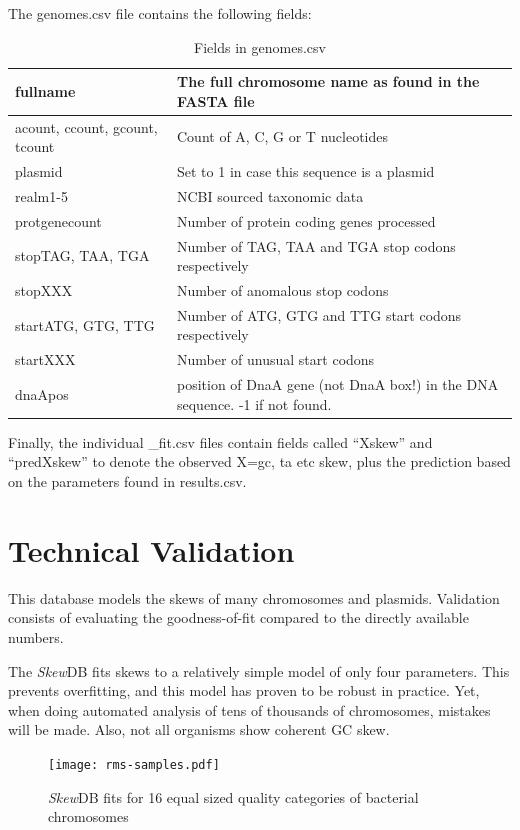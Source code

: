 \documentclass[fleqn,10pt]{wlscirep}
\begin{document}
The genomes.csv file contains the following fields:

\begin{table}[H]
\begin{tabular}{|l|l|}
  \hline
fullname                 & The full chromosome name as found in the FASTA file                \\ \hline
acount, ccount, gcount, tcount                 & Count of A, C, G or T nucleotides                \\ \hline
plasmid & Set to 1 in case this sequence is a plasmid \\ \hline
realm1-5     & NCBI sourced taxonomic data \\ \hline
protgenecount                           & Number of protein coding genes processed          \\ \hline
stopTAG, TAA, TGA & Number of TAG, TAA and TGA stop codons respectively          \\ \hline
stopXXX & Number of anomalous stop codons  \\ \hline
startATG, GTG, TTG & Number of ATG, GTG and TTG start codons respectively          \\ \hline
startXXX & Number of unusual start codons  \\ \hline
dnaApos & position of DnaA gene (not DnaA box!) in the DNA sequence. -1 if not found.  \\ \hline
\end{tabular}
\caption{Fields in genomes.csv}
\label{tab:genomes-table}
\end{table}


Finally, the individual \_fit.csv files contain fields called ``Xskew'' and ``predXskew'' to denote the observed X=gc, ta etc skew, plus the prediction based on the parameters found in results.csv. 
\section*{Technical Validation}
This database models the skews of many chromosomes and plasmids. Validation consists of evaluating the goodness-of-fit compared to the directly available numbers.

The \emph{Skew}DB fits skews to a relatively simple model of only four parameters. This prevents overfitting, and this model has proven to be robust in practice. Yet, when doing automated analysis of tens of thousands of chromosomes, mistakes will be made. Also, not all organisms show coherent GC skew.

\begin{figure}[tbhp]
\centering
\texttt{[image: rms-samples.pdf]}
\caption{\emph{Skew}DB fits for 16 equal sized quality categories of bacterial chromosomes}
\label{fig:rms-samples}
\end{figure}
\end{document}
